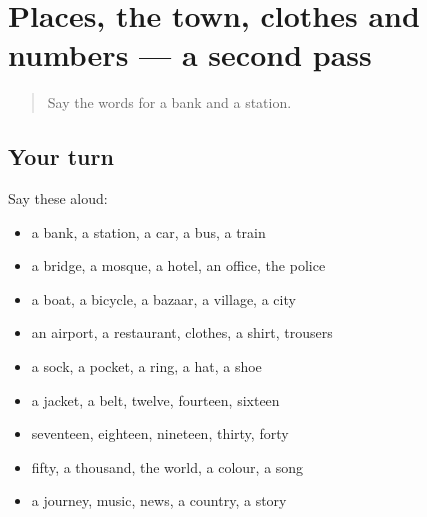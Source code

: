 \section[(dialogue)]{Places, the town, clothes and numbers — a second pass}

\label{lesson:FA-R78-second-pass-places-the-town-clothes-and-numbers}



\begin{quote}
Say the words for a bank and a station.
\end{quote}

\subsection*{Your turn}
Say these aloud:

\begin{itemize}
\raggedright
  \item a bank, a station, a car, a bus, a train
  \item a bridge, a mosque, a hotel, an office, the police
  \item a boat, a bicycle, a bazaar, a village, a city
  \item an airport, a restaurant, clothes, a shirt, trousers
  \item a sock, a pocket, a ring, a hat, a shoe
  \item a jacket, a belt, twelve, fourteen, sixteen
  \item seventeen, eighteen, nineteen, thirty, forty
  \item fifty, a thousand, the world, a colour, a song
  \item a journey, music, news, a country, a story
\end{itemize}

